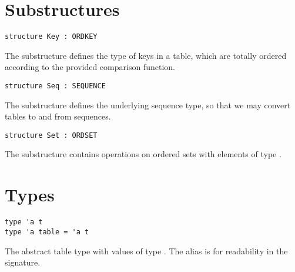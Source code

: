 \section{Substructures}
\label{sec:ordtable-interface::substructures}

\begin{cluster}
\label{grp:grm:ordtable-interface::structure}

\begin{gram}
\label{grm:ordtable-interface::structure}
\begin{verbatim}
structure Key : ORDKEY
\end{verbatim}
The  substructure defines the type of keys in a table, which are
totally ordered according to the provided comparison function.

\end{gram}
\end{cluster}

\begin{cluster}
\label{grp:grm:ordtable-interface::sequence}

\begin{gram}
\label{grm:ordtable-interface::sequence}
\begin{verbatim}
structure Seq : SEQUENCE
\end{verbatim}
The  substructure defines the underlying sequence type, so that we
may convert tables to and from sequences.

\end{gram}
\end{cluster}

\begin{cluster}
\label{grp:grm:ordtable-interface::ordset}

\begin{gram}
\label{grm:ordtable-interface::ordset}
\begin{verbatim}
structure Set : ORDSET
\end{verbatim}
The  substructure contains operations on ordered sets with elements of
type .

\end{gram}
\end{cluster}


\section{Types}
\label{sec:ordtable-interface::types}

\begin{cluster}
\label{grp:grm:ordtable-interface::type}

\begin{gram}
\label{grm:ordtable-interface::type}
\begin{verbatim}
type 'a t
type 'a table = 'a t
\end{verbatim}
The abstract table type with values of type . The alias  is
for readability in the signature.

\end{gram}
\end{cluster}


